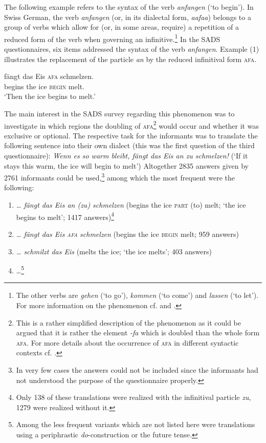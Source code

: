 \documentclass[output=paper]{LSP/langsci}
\begin{document}
The following example refers to the syntax of the verb \emph{anfangen} (‘to begin’). In Swiss German, the verb \emph{anfangen} (or, in its dialectal form, \emph{aafaa}) belongs to a group of verbs which allow for (or, in some areas, require) a repetition of a reduced form of the verb when governing an infinitive.\footnote{The other verbs are \emph{gehen} (‘to go’), \emph{kommen} (‘to come’) and \emph{lassen} (‘to let’). For more information on the phenomenon cf. \citet{glaser_empirische_2011} and \citet{lotscher_zur_1993}.} In the SADS questionnaires, six items addressed the syntax of the verb \emph{anfangen}. Example (1) illustrates the replacement of the particle \emph{an} by the reduced infinitival form \textsc{afa}.

\ea %
\label{ex:1}
\gll [dann]  fängt  das Eis  \textsc{afa} schmelzen.\\
[then]    begins  the ice    \textsc{begin}  melt.	\\
\glt `Then the ice begins to melt.'
\z

The main interest in the SADS survey regarding this phenomenon was to investigate in which regions the doubling of \textsc{afa}\footnote{ This is a rather simplified description of the phenomenon as it could be argued that it is rather the element \emph{{}-fa} which is doubled than the whole form \textsc{afa}. For more details about the occurrence of \textsc{afa} in different syntactic contexts cf. \citet{andres_verdoppelung_2011}.} would occur and whether it was exclusive or optional. The respective task for the informants was to translate the following sentence into their own dialect (this was the first question of the third questionnaire):
\vskip11pt
\emph{Wenn es so warm bleibt, fängt das Eis an zu schmelzen!} (‘If it stays this warm, the ice will begin to melt’)
\vskip11pt
Altogether 2835 answers given by 2761 informants could be used,\footnote{In very few cases the answers could not be included since the informants had not understood the purpose of the questionnaire properly.} among which the most frequent were the following:

\begin{enumerate}
\item \emph{… fängt das Eis an (zu) schmelzen} (begins the ice \textsc{part} (to) melt; ‘the ice begins to melt’; 1417 answers)\footnote{ Only 138 of these translations were realized with the infinitival particle \emph{zu}, 1279 were realized without it.}

\item \emph{… fängt das Eis }\emph{\textsc{afa}}\emph{ schmelzen} (begins the ice \textsc{begin} melt; 959 answers)

\item \emph{… schmilzt das Eis} (melts the ice; ‘the ice melts’; 403 answers)

\item …\footnote{Among the less frequent variants which are not listed here were translations using a periphrastic \emph{do}{}-construction or the future tense.}
\end{enumerate}
\end{document}
